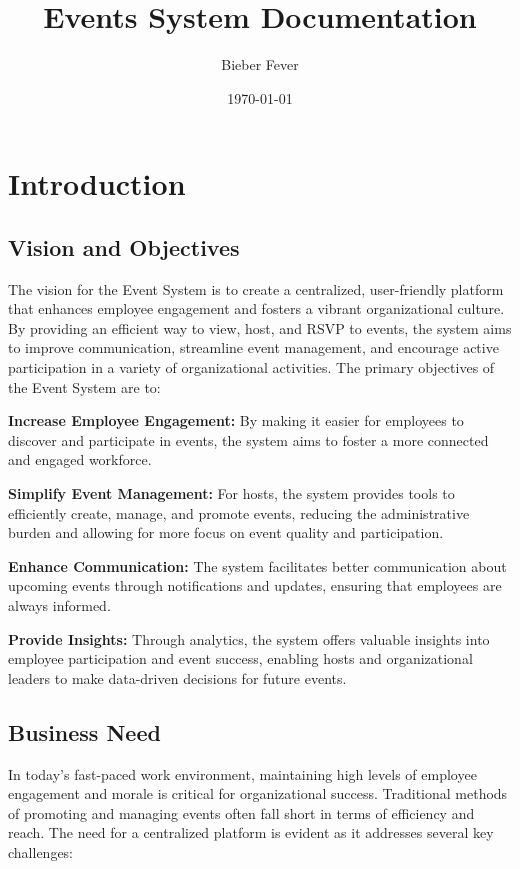 \documentclass[a4paper,12pt]{article}
\title{Events System Documentation}
\author{Bieber Fever}
\date{\today}
\begin{document}
\maketitle
\tableofcontents

\section{Introduction}
\label{sec:introduction}

\subsection{Vision and Objectives}
The vision for the Event System is to create a centralized, user-friendly platform that 
enhances employee engagement and fosters a vibrant organizational culture. By providing 
an efficient way to view, host, and RSVP to events, the system aims to improve communication, 
streamline event management, and encourage active participation in a variety of organizational 
activities. The primary objectives of the Event System are to:

\textbf{Increase Employee Engagement:} By making it easier for employees to discover and 
participate in events, the system aims to foster a more connected and engaged workforce.

\textbf{Simplify Event Management:} For hosts, the system provides tools to efficiently 
create, manage, and promote events, reducing the administrative burden and allowing for 
more focus on event quality and participation.

\textbf{Enhance Communication:} The system facilitates better communication about upcoming 
events through notifications and updates, ensuring that employees are always informed.

\textbf{Provide Insights:} Through analytics, the system offers valuable insights into 
employee participation and event success, enabling hosts and organizational leaders to 
make data-driven decisions for future events.

\subsection{Business Need}
In today's fast-paced work environment, maintaining high levels of employee engagement 
and morale is critical for organizational success. Traditional methods of promoting and 
managing events often fall short in terms of efficiency and reach. The need for a centralized 
platform is evident as it addresses several key challenges:
\end{document}
